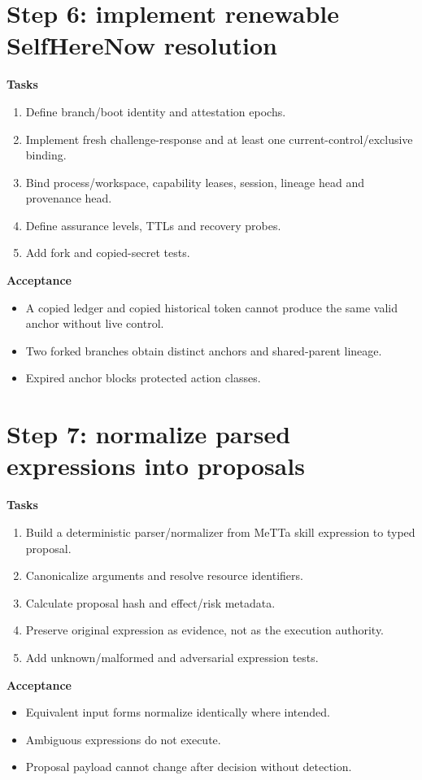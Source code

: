 \documentclass[11pt,oneside]{report}
\begin{document}
\section{Step 6: implement renewable SelfHereNow resolution}

\textbf{Tasks}
\begin{enumerate}
  \item Define branch/boot identity and attestation epochs.
  \item Implement fresh challenge-response and at least one current-control/exclusive binding.
  \item Bind process/workspace, capability leases, session, lineage head and provenance head.
  \item Define assurance levels, TTLs and recovery probes.
  \item Add fork and copied-secret tests.
\end{enumerate}

\textbf{Acceptance}
\begin{itemize}
  \item A copied ledger and copied historical token cannot produce the same valid anchor without live control.
  \item Two forked branches obtain distinct anchors and shared-parent lineage.
  \item Expired anchor blocks protected action classes.
\end{itemize}

\section{Step 7: normalize parsed expressions into proposals}

\textbf{Tasks}
\begin{enumerate}
  \item Build a deterministic parser/normalizer from MeTTa skill expression to typed proposal.
  \item Canonicalize arguments and resolve resource identifiers.
  \item Calculate proposal hash and effect/risk metadata.
  \item Preserve original expression as evidence, not as the execution authority.
  \item Add unknown/malformed and adversarial expression tests.
\end{enumerate}

\textbf{Acceptance}
\begin{itemize}
  \item Equivalent input forms normalize identically where intended.
  \item Ambiguous expressions do not execute.
  \item Proposal payload cannot change after decision without detection.
\end{itemize}
\end{document}
